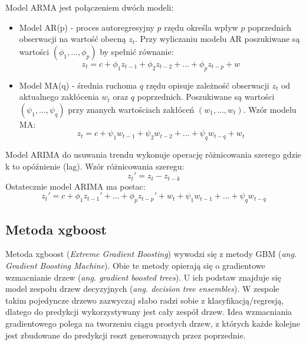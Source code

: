 \documentclass[11pt]{report}
\begin{document}
Model ARMA jest połączeniem dwóch modeli:
\begin{itemize}
\item Model AR(p) - proces autoregresyjny $p$ rzędu określa wpływ $p$ poprzednich obserwacji na wartość obecną $z_t$.
Przy wyliczaniu modelu AR poszukiwane są wartości $(\phi_1, ..., \phi_p)$ by spełnić równanie\cite{armia_s_zajac}:
\begin{equation}
    z_t = c + \phi_1 z_{t-1} + \phi_2 z_{t-2} + ... + \phi_p z_{t-p}+w
\end{equation}


\item Model MA(q) - średnia ruchoma $q$ rzędu opisuje zależność obserwacji $z_t$ od aktualnego zakłócenia $w_t$ oraz $q$ poprzednich.  Poszukiwane są wartości $(\psi_1, ..., \psi_q)$ przy znanych wartościach zakłóceń $(w_1, ..., w_t)$. Wzór modelu MA\cite{armia_s_zajac}: 
\begin{equation}
    z_t = c + \psi_1 w_{t-1} + \psi_2 w_{t-2} + ... + \psi_q w_{t-q} + w_t
\end{equation}
\end{itemize}

Model ARIMA do usuwania trendu wykonuje operację różnicowania szerego gdzie k to opóźnienie (lag). Wzór różnicowania szeregu\cite{armia_s_zajac}:
\begin{equation}
    z_{t}'=z_t-z_{t-k}
\end{equation}
Ostatecznie model ARIMA ma postac\cite{armia_s_zajac}:
\begin{equation}
    z_t' = c + \phi_1 z_{t-1}' + ... + \phi_p z_{t-p}' + w_t + \psi_1 w_{t-1} + ... + \psi_q w_{t-q}
\end{equation}


\subsection{Metoda xgboost}
Metoda xgboost (\textit{Extreme Gradient Boosting}) wywodzi się z metody GBM (\textit{ang. Gradient Boosting Machine}).
Obie te metody opierają się o gradientowe wzmacnianie drzew (\textit{ang. gradient boosted trees}).
U ich podstaw znajduje się model zespołu drzew decyzyjnych (\textit{ang. decision tree ensembles}).
W zespole takim pojedyncze drzewo zazwyczaj słabo radzi sobie z klasyfikacją/regresją, dlatego do predykcji wykorzystywany jest cały zespół drzew.
Idea wzmacniania gradientowego polega na tworzeniu ciągu prostych drzew, z których każde kolejne jest zbudowane do predykcji reszt generowanych przez poprzednie.
\end{document}
